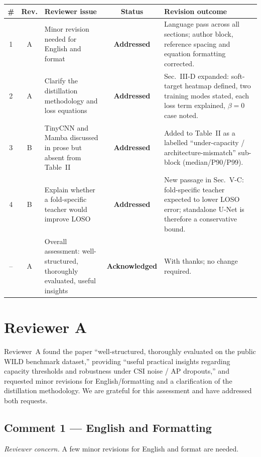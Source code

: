 \documentclass[11pt]{article}
\newcommand{\status}[1]{\textbf{\color{okgreen}#1}}
\newcommand{\concern}[1]{\textit{Reviewer concern.} #1}
\begin{document}
\begin{center}
\small
\begin{tabularx}{\textwidth}{@{}c c L{5.6cm} c L{5.0cm}@{}}
\toprule
\textbf{\#} & \textbf{Rev.} & \textbf{Reviewer issue} & \textbf{Status} & \textbf{Revision outcome} \\
 & A & Minor revision needed for English and format & \status{Addressed} & Language pass across all sections; author block, reference spacing and equation formatting corrected. \\
2 & A & Clarify the distillation methodology and loss equations & \status{Addressed} & Sec.~III-D expanded: soft-target heatmap defined, two training modes stated, each loss term explained, $\beta{=}0$ case noted. \\
3 & B & TinyCNN and Mamba discussed in prose but absent from Table~II & \status{Addressed} & Added to Table~II as a labelled ``under-capacity / architecture-mismatch'' sub-block (median/P90/P99). \\
4 & B & Explain whether a fold-specific teacher would improve LOSO & \status{Addressed} & New passage in Sec.~V-C: fold-specific teacher expected to lower LOSO error; standalone U-Net is therefore a conservative bound. \\
\midrule
-- & A & Overall assessment: well-structured, thoroughly evaluated, useful insights & \status{Acknowledged} & With thanks; no change required. \\
\bottomrule
\end{tabularx}
\end{center}

\section{Reviewer A}

Reviewer~A found the paper ``well-structured, thoroughly evaluated on the public WILD benchmark dataset,'' providing ``useful practical insights regarding capacity thresholds and robustness under CSI noise / AP dropouts,'' and requested minor revisions for English/formatting and a clarification of the distillation methodology. We are grateful for this assessment and have addressed both requests.

\subsection{Comment 1 --- English and Formatting}
\concern{A few minor revisions for English and format are needed.}
\end{document}
